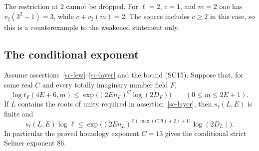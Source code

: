 The restriction at $2$ cannot be dropped.
For $\ell=2$, $c=1$, and $m=2$ one has
$v_2(3^2-1)=3$, while $c+v_2(m)=2$.
The source includes $c\ge2$ in this case, so this is
a counterexample to the weakened statement only.

\subsection{The conditional exponent}

\begin{proposition}\label{sc-exponent}
Assume assertions~\ref{sc-few}--\ref{sc-layer} and the
bound (SC15).  Suppose that, for some real $C$ and every
totally imaginary number field $F$,
\[
 \log t_F(4E+6,m)
      \le\exp\bigl((2E n_F)^C\log(2D_F)\bigr)
       \qquad(0\le m\le2E+1).
 \tag{SC20}
\]
If $L$ contains the roots of unity required in
assertion~\ref{sc-layer}, then $s_\ell(L,E)$ is finite and
\[
 s_\ell(L,E)\log\ell
   \le\exp\bigl((2E n_L)^{\,5(\max(C,9)+2)+11}
                          \log(2D_L)\bigr).
 \tag{SC21}
\]
In particular the proved homology exponent $C=13$ gives
the conditional strict Selmer exponent $86$.
\end{proposition}
